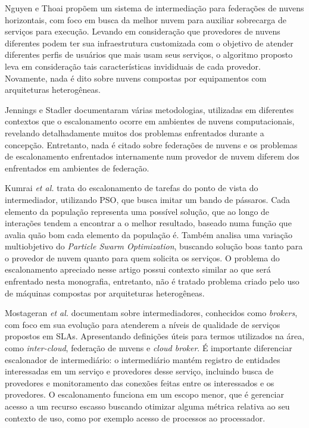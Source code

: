 Nguyen e Thoai \cite{7791859} propõem um sistema de intermediação para federações de nuvens horizontais, com foco em busca da melhor nuvem para auxiliar sobrecarga de serviços para execução. Levando em consideração que provedores de nuvens diferentes podem ter sua infraestrutura customizada com o objetivo de atender diferentes perfis de usuários que mais usam seus serviços, o algoritmo proposto leva em consideração tais características invididuais de cada provedor. Novamente, nada é dito sobre nuvens compostas por equipamentos com arquiteturas heterogêneas.

Jennings e Stadler \cite{Jennings:2015:RMC:2793474.2793493} documentaram  várias metodologias, utilizadas em diferentes contextos que o escalonamento ocorre em ambientes de nuvens computacionais, revelando detalhadamente muitos dos problemas enfrentados durante a concepção. Entretanto, nada é citado sobre federações de nuvens e os problemas de escalonamento enfrentados internamente num provedor de nuvem diferem dos enfrentados em ambientes de federação.

Kumrai \textit{et al.} \cite{7467407} trata do escalonamento de tarefas do ponto de vista do intermediador, utilizando \acrfull{PSO}, que busca imitar um bando de pássaros. Cada elemento da população representa uma possível solução, que ao longo de interações tendem a encontrar a o melhor resultado, baseado numa função que avalia quão bom cada elemento da população é. Também analisa uma variação multiobjetivo do \textit{Particle Swarm Optimization}, buscando solução boas tanto para o provedor de nuvem quanto para quem solicita os serviços. O problema do escalonamento apreciado nesse artigo possui contexto similar ao que será enfrentado nesta monografia, entretanto, não é tratado problema criado pelo uso de máquinas compostas por arquiteturas heterogêneas.

Mostageran \textit{et al.} \cite{7224588} documentam sobre intermediadores, conhecidos como \textit{brokers}, com foco em sua evolução para atenderem a níveis de qualidade de serviços propostos em \acrshort{SLA}s. Apresentando definições úteis para termos utilizados na área, como \textit{inter-cloud}, federação de nuvens e \textit{cloud broker}. É importante diferenciar escalonador de intermediário: o intermediário mantém registro de entidades interessadas em um serviço e provedores desse serviço, incluindo busca de provedores e monitoramento das conexões feitas entre os interessados e os provedores. O escalonamento funciona em um escopo menor, que é gerenciar acesso a um recurso escasso buscando otimizar alguma métrica relativa ao seu contexto de uso, como por exemplo acesso de processos ao processador.

